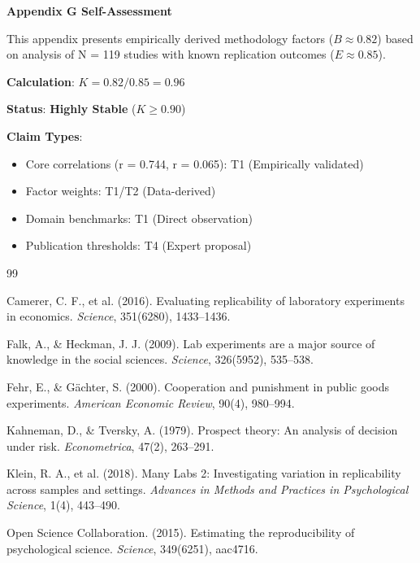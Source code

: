 \documentclass[11pt,a4paper]{article}
\begin{document}
\begin{eslbox}
\textbf{Appendix G Self-Assessment}

This appendix presents empirically derived methodology factors ($B \approx 0.82$) based on analysis of N = 119 studies with known replication outcomes ($E \approx 0.85$).

\textbf{Calculation}: $K = 0.82/0.85 = 0.96$

\textbf{Status}: \textcolor{eslgreen}{\textbf{Highly Stable}} ($K \geq 0.90$)

\textbf{Claim Types}:
\begin{itemize}
    \item Core correlations (r = 0.744, r = 0.065): T1 (Empirically validated)
    \item Factor weights: T1/T2 (Data-derived)
    \item Domain benchmarks: T1 (Direct observation)
    \item Publication thresholds: T4 (Expert proposal)
\end{itemize}
\end{eslbox}


\newpage


\begin{thebibliography}{99}

Camerer, C. F., et al. (2016).
Evaluating replicability of laboratory experiments in economics.
\textit{Science}, 351(6280), 1433--1436.

Falk, A., \& Heckman, J. J. (2009).
Lab experiments are a major source of knowledge in the social sciences.
\textit{Science}, 326(5952), 535--538.

Fehr, E., \& Gächter, S. (2000).
Cooperation and punishment in public goods experiments.
\textit{American Economic Review}, 90(4), 980--994.

Kahneman, D., \& Tversky, A. (1979).
Prospect theory: An analysis of decision under risk.
\textit{Econometrica}, 47(2), 263--291.

Klein, R. A., et al. (2018).
Many Labs 2: Investigating variation in replicability across samples and settings.
\textit{Advances in Methods and Practices in Psychological Science}, 1(4), 443--490.

Open Science Collaboration. (2015).
Estimating the reproducibility of psychological science.
\textit{Science}, 349(6251), aac4716.

\end{thebibliography}
\end{document}
